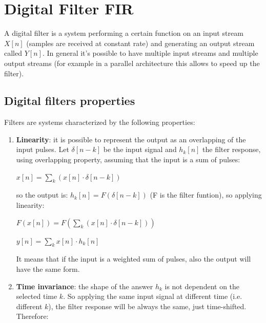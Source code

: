 \chapter{Digital Filter FIR}
A digital filter is a system performing a certain function on an input stream $ X[n] $ (samples are received at constant rate) and generating an output stream called $ Y[n] $. 
In general it's possible to have multiple input streams and multiple output streams (for example in a parallel architecture this allows to speed up the filter).
\section{Digital filters properties}
Filters are systems characterized by the following properties:
\begin{enumerate}
	\item \textbf{Linearity}: it is possible to represent the output as an overlapping of the input pulses. Let $\delta[n-k]$ be the input signal and $ h_{k}[n] $ the filter response, using overlapping property, assuming that the input is a sum of pulses: 
	\begin{center}
		$ x[n]=\sum\limits_{k}^{} (x[n]\cdot \delta[n-k]) $
		\end{center}
		so the output is: $ h_{k}[n] =F(\delta[n-k])$ (F is the filter funtion), so applying linearity: 
			\begin{center}
				$ F(x[n])=F(\sum\limits_{k}^{ } (x[n]\cdot \delta[n-k])) $\\
			\end{center}
			\begin{center}
				$ y[n]=\sum\limits_{k}^{ } x[n]\cdot h_{k}[n] $
			\end{center}
    It means that if the input is a weighted sum of pulses, also the output will have the same form.
    \item  \textbf{Time invariance}: the shape of the answer $ h_{k} $ is not dependent on the selected time $ k $. So applying the same input signal at different time (i.e. different $ k $), the filter response will be always the same, just time-shifted. Therefore:
    

\end{enumerate}
